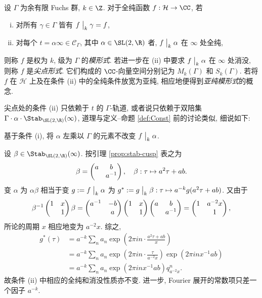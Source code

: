 \begin{definition}\label{def:modular-form-gen}
	   
	设 $\Gamma$ 为余有限 Fuchs 群, $k \in \Z$. 对于全纯函数 $f: \mathcal{H} \to \CC$, 若
	\begin{enumerate}[(i)]
		\item 对所有 $\gamma \in \Gamma$ 皆有 $f \;\big|_{k} \; \gamma = f$,
		\item 对每个 $t = \alpha\infty \in \mathcal{C}_\Gamma$, 其中 $\alpha \in \SL(2,\R)$ 者, $f\;\big|_{k} \;\alpha$ 在 $\infty$ 处全纯,
	\end{enumerate}
	则称 $f$ 是权为 $k$, 级为 $\Gamma$ 的\emph{模形式}. 若进一步在 (ii) 中要求 $f \;\big|_{k} \; \alpha$ 在 $\infty$ 处消没, 则称 $f$ 是\emph{尖点形式}. 它们构成的 $\CC$-向量空间分别记为 $M_k(\Gamma)$ 和 $S_k(\Gamma)$. 若将 $f$ 在 $\mathcal{H}$ 上及在条件 (ii) 中的全纯条件放宽为亚纯, 相应地便得到\emph{亚纯模形式}的概念.
\end{definition}

尖点处的条件 (ii) 只依赖于 $t$ 的 $\Gamma$-轨道, 或者说只依赖于双陪集 $\Gamma \cdot \alpha \cdot \Stab_{\SL(2,\R)}(\infty)$, 道理与定义--命题 \ref{def:Const} 前的讨论类似, 细说如下:
\begin{compactitem}
	\item 基于条件 (i), 将 $\alpha$ 左乘以 $\Gamma$ 的元素不改变 $f \;\big|_{k} \; \alpha$.
	\item 设 $\beta \in \Stab_{\SL(2,\R)}(\infty)$. 按引理 \ref{prop:stab-cusp} 表之为
	\[ \beta = \begin{pmatrix} a & b \\  & a^{-1} \end{pmatrix}, \quad \beta: \tau \mapsto a^2 \tau + ab. \]
	变 $\alpha$ 为 $\alpha\beta$ 相当于变 $g := f \;\big|_{k} \; \alpha$ 为 $g^* := g \;\big|_{k} \; \beta: \tau \mapsto a^{-k} g(a^2 \tau + ab)$. 又由于
	\[ \beta^{-1} \begin{pmatrix} 1 & x \\  & 1 \end{pmatrix} \beta = \begin{pmatrix} a^{-1} & -b \\  & a \end{pmatrix} \begin{pmatrix} 1 & x \\  & 1 \end{pmatrix} \begin{pmatrix} a & b \\  & a^{-1} \end{pmatrix} = \begin{pmatrix} 1 & a^{-2} x \\  & 1 \end{pmatrix}, \]
	所论的周期 $x$ 相应地变为 $a^{-2} x$. 综之,
	\begin{align*}
		g^*(\tau) & = a^{-k} \sum_n a_n \exp\left( 2\pi i n \cdot \frac{a^2 \tau + ab}{x} \right) \\
		& = a^{-k} \sum_n a_n \exp\left( 2\pi i n \cdot \frac{\tau}{a^{-2}x} \right) \exp\left( 2\pi i n x^{-1} ab \right) \\
		& = a^{-k} \sum_n a_n \exp\left( 2\pi i n x^{-1} ab \right) q_{a^{-2}x}^n.
	\end{align*}
	故条件 (ii) 中相应的全纯和消没性质亦不变. 进一步, Fourier 展开的常数项只差一个因子 $a^{-k}$.
\end{compactitem}

